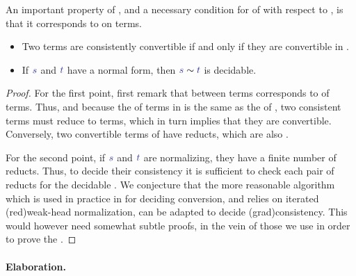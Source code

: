 An important property of , and a necessary condition
for  of  with respect to ,
is that it corresponds to  on  terms.

\begin{proposition}
	\label{prop:cons-static}
  \begin{itemize}
  \item Two  terms are consistently convertible if and only if
    they are convertible in .
  \item If $\tcol{s}$ and $\tcol{t}$ have a normal form,
    then $\tcol{s} \cons \tcol{t}$ is decidable.
  \end{itemize}
\end{proposition}

\begin{proof}
	For the first point, first remark that 
  between  terms corresponds to  of terms.
  Thus, and because the  of  terms in 
  is the same as the  of ,
  two consistent  terms must reduce to  terms,
  which in turn implies that they are convertible.
	Conversely, two convertible terms of  have  reducts,
  which are also .

  For the second point, if $\tcol{s}$ and $\tcol{t}$ are normalizing,
  they have a finite number of reducts.
  Thus, to decide their consistency it is sufficient to check each pair of reducts
  for the decidable .
  We conjecture that the more reasonable algorithm which is used in practice in \eg {}
  for deciding conversion, and relies on iterated \kl(red){weak-head} normalization,
  can be adapted to decide \kl(grad){consistency}. This would
  however need somewhat subtle proofs, in the vein of those we use in order
  to prove the .
\end{proof}

\paragraph{Elaboration.}


